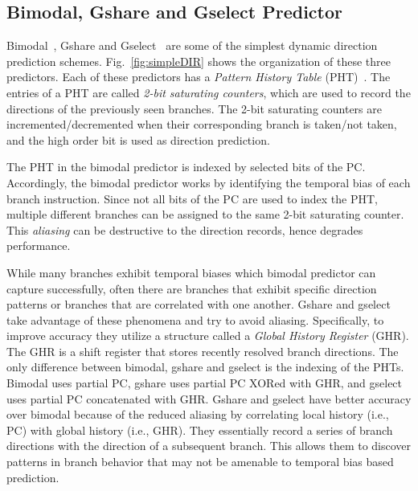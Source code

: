 \subsection{Bimodal, Gshare and Gselect Predictor}
\label{sec:background:dirpred:bimodal}
Bimodal~\cite{bimodal}, Gshare and Gselect~\cite{McFarling} are some of the simplest dynamic direction prediction schemes. Fig.~\ref{fig:simpleDIR} shows the organization of these three predictors. Each of these predictors has a \textit{Pattern History Table} (PHT)~\cite{pht}. The entries of a PHT are called \textit{2-bit saturating counters}, which are used to record the directions of the previously seen branches. The 2-bit saturating counters are incremented/decremented when their corresponding branch is taken/not taken, and the high order bit is used as direction prediction.

The PHT in the bimodal predictor is indexed by selected bits of the PC. Accordingly, the bimodal predictor works by identifying the temporal bias of each branch instruction. Since not all bits of the PC are used to index the PHT, multiple different branches can be assigned to the same 2-bit saturating counter. This \textit{aliasing} can be destructive to the direction records, hence degrades performance.

While many branches exhibit temporal biases which bimodal predictor can capture successfully, often there are branches that exhibit specific direction patterns or branches that are correlated with one another. Gshare and gselect take advantage of these phenomena and try to avoid aliasing. Specifically, to improve accuracy they utilize a structure called a \textit{Global History Register} (GHR). The GHR is a shift register that stores recently resolved branch directions. The only difference between bimodal, gshare and gselect is the indexing of the PHTs. Bimodal uses partial PC, gshare uses partial PC XORed with GHR, and gselect uses partial PC concatenated with GHR. Gshare and gselect have better accuracy over bimodal because of the reduced aliasing by correlating local history (i.e., PC) with global history (i.e., GHR).
They essentially record a series of branch directions with the direction of a subsequent branch. This allows them  to discover patterns in branch behavior that may not be amenable to temporal bias based prediction.



